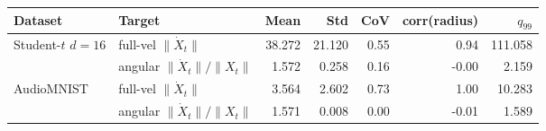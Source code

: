 \begin{tabular}{llrrrrr}
\toprule
Dataset & Target & Mean & Std & CoV & corr(radius) & $q_{99}$ \\
\midrule
Student-$t$ $d{=}16$ & full-vel $\|\dot X_t\|$ & 38.272 & 21.120 & 0.55 & 0.94 & 111.058 \\
 & angular $\|\dot X_t\|/\|X_t\|$ & 1.572 & 0.258 & 0.16 & -0.00 & 2.159 \\
AudioMNIST & full-vel $\|\dot X_t\|$ & 3.564 & 2.602 & 0.73 & 1.00 & 10.283 \\
 & angular $\|\dot X_t\|/\|X_t\|$ & 1.571 & 0.008 & 0.00 & -0.01 & 1.589 \\
\bottomrule
\end{tabular}